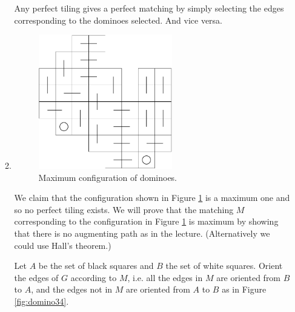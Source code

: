 \documentclass[12pt]{article}
\begin{document}
\begin{enumerate}
\begin{enumerate}
Any perfect tiling gives a perfect matching by simply selecting the
edges corresponding to the dominoes selected. And vice versa.
\item
\begin{figure}[ht]
\begin{center}
\includegraphics[height=2.3in]{../figures/domino2}
\end{center}
\caption{Maximum configuration of dominoes. \label{fig:domino2}}
\end{figure}

We claim that the configuration shown in Figure \ref{fig:domino2} is a
maximum one and so no perfect tiling exists. We will prove that the
matching $M$ corresponding to the configuration in Figure
\ref{fig:domino2} is maximum by showing that there is no augmenting
path as in the lecture. (Alternatively we could use Hall's theorem.)

Let $A$ be the set of black squares and $B$ the set of white squares.
Orient the edges of $G$ according to $M$, i.e. all the edges in $M$
are oriented from $B$ to $A$, and the edges not in $M$ are oriented
from $A$ to $B$ as in Figure \ref{fig:domino34}.


\end{enumerate}
\end{enumerate}
\end{document}
